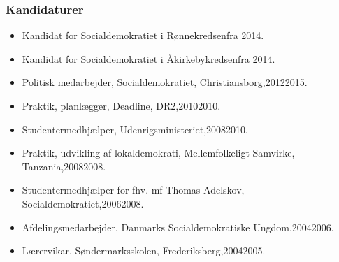 \documentclass[11pt, a4paper]{awesome-cv}
\begin{document}
\begin{cvletter}
\subsubsection*{Kandidaturer}
\begin{itemize}
\item Kandidat for Socialdemokratiet i Rønnekredsenfra 2014.
\item Kandidat for Socialdemokratiet i Åkirkebykredsenfra 2014.
\end{itemize}
\begin{itemize}
\item Politisk medarbejder, Socialdemokratiet, Christiansborg,20122015.
\item Praktik, planlægger, Deadline, DR2,20102010.
\item Studentermedhjælper, Udenrigsministeriet,20082010.
\item Praktik, udvikling af lokaldemokrati, Mellemfolkeligt Samvirke, Tanzania,20082008.
\item Studentermedhjælper for fhv. mf Thomas Adelskov, Socialdemokratiet,20062008.
\item Afdelingsmedarbejder, Danmarks Socialdemokratiske Ungdom,20042006.
\item Lærervikar, Søndermarksskolen, Frederiksberg,20042005.
\end{itemize}
\end{cvletter}
\end{document}
